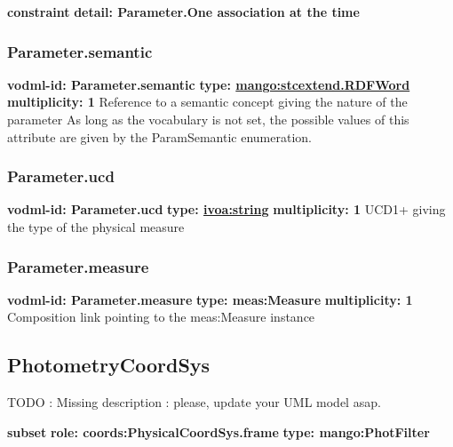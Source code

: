     \noindent \textbf{constraint} \newline
    \indent    \textbf{detail: Parameter.One association at the time
 }\newline


    \subsubsection{Parameter.semantic}
      \textbf{vodml-id: Parameter.semantic} \newline
      \textbf{type: \hyperref[sect:stcextend.RDFWord]{mango:stcextend.RDFWord}} \newline
      \textbf{multiplicity: 1} \newline 
      Reference to a semantic concept giving the nature of the parameter As long as the vocabulary is not set, the possible values of this attribute are given by the ParamSemantic enumeration.

    \subsubsection{Parameter.ucd}
      \textbf{vodml-id: Parameter.ucd} \newline
      \textbf{type: \hyperref[sect:ivoa]{ivoa:string}} \newline
      \textbf{multiplicity: 1} \newline 
      UCD1+ giving the type of the physical measure

    \subsubsection{Parameter.measure}
      \textbf{vodml-id: Parameter.measure} \newline
      \textbf{type: meas:Measure} \newline
      \textbf{multiplicity: 1} \newline 
      Composition link pointing to the meas:Measure instance

  \subsection{PhotometryCoordSys}
  \label{sect:PhotometryCoordSys}
    TODO : Missing description : please, update your UML model asap.

    \noindent \textbf{subset} \newline
    \indent   \textbf{role: coords:PhysicalCoordSys.frame} \newline
    \indent   \textbf{type: mango:PhotFilter} \newline



